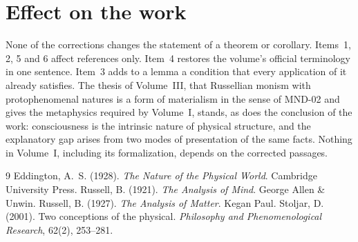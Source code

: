 \documentclass{situationist-preprint}
\begin{document}
\section{Effect on the work}

None of the corrections changes the statement of a theorem or corollary. Items~1, 2, 5 and 6 affect references only. Item~4 restores the volume's official terminology in one sentence. Item~3 adds to a lemma a condition that every application of it already satisfies. The thesis of Volume~III, that Russellian monism with protophenomenal natures is a form of materialism in the sense of MND-02 and gives the metaphysics required by Volume~I, stands, as does the conclusion of the work: consciousness is the intrinsic nature of physical structure, and the explanatory gap arises from two modes of presentation of the same facts. Nothing in Volume~I, including its formalization, depends on the corrected passages.

\begin{thebibliography}{9}\small
{} Eddington, A.~S. (1928). \emph{The Nature of the Physical World}. Cambridge University Press.
 Russell, B. (1921). \emph{The Analysis of Mind}. George Allen \& Unwin.
 Russell, B. (1927). \emph{The Analysis of Matter}. Kegan Paul.
 Stoljar, D. (2001). Two conceptions of the physical. \emph{Philosophy and Phenomenological Research}, 62(2), 253--281.
\end{thebibliography}
\end{document}
